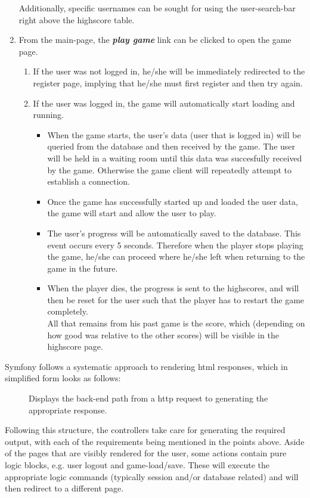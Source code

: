 \documentclass[12pt]{report}
\begin{document}
\begin{enumerate}
Additionally, specific usernames can be sought for using the user-search-bar right above the highscore table.
\item From the main-page, the \emph{\textbf{play game}} link can be clicked to open the game page.
\begin{enumerate}
\item If the user was not logged in, he/she will be immediately redirected to the register page, implying that he/she must first register and then try again.
\item If the user was logged in, the game will automatically start loading and running.
\begin{itemize}
\item When the game starts, the user's data (user that is logged in) will be queried from the database and then received by the game. The user will be held in a waiting room until this data was succesfully received by the game. Otherwise the game client will repeatedly attempt to establish a connection.
\item Once the game has successfully started up and loaded the user data, the game will start and allow the user to play.
\item The user's progress will be automatically saved to the database. This event occurs every 5 seconds. Therefore when the player stops playing the game, he/she can proceed where he/she left when returning to the game in the future.
\item When the player dies, the progress is sent to the highscores, and will then be reset for the user such that the player has to restart the game completely.\\All that remains from his past game is the score, which (depending on how good was relative to the other scores) will be visible in the highscore page.
\end{itemize}
\end{enumerate}
\end{enumerate}
Symfony follows a systematic approach to rendering html responses, which in simplified form looks as follows:

\begin{figure}[h]
\centering
{}
\caption{Displays the back-end path from a http request to generating the appropriate response.}
\end{figure}
Following this structure, the controllers take care for generating the required output, with each of the requirements being mentioned in the points above. Aside of the pages that are visibly rendered for the user, some actions contain pure logic blocks, e.g. user logout and game-load/save. These will execute the appropriate logic commands (typically session and/or database related) and will then redirect to a different page.
\end{document}
